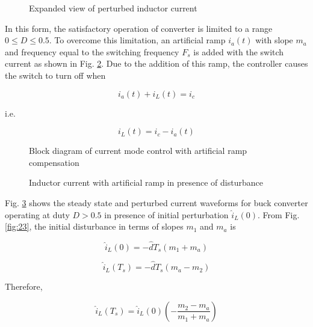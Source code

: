 \documentclass[a4paper]{IEEEtran}
\begin{document}
	\begin{figure}
		\centering
		
		\caption{Expanded view of perturbed inductor current}
		\label{fig:20}
	\end{figure}

	In this form, the satisfactory operation of converter is limited to a range $0 \leq D \leq 0.5$. To overcome this limitation, an artificial ramp $i_a(t)$ with slope $m_a$ and frequency equal to the switching frequency $F_s$ is added with the switch current as shown in Fig. \ref{fig:21}. Due to the addition of this ramp, the controller causes the switch to turn off when

	\begin{equation*}
		i_a(t) + i_L(t) = i_c
	\end{equation*}

	i.e.

	\begin{equation}
		i_L(t) = i_c - i_a(t)
		\label{eq:9}
	\end{equation}

	\begin{figure}
		\centering
		
		\caption{Block diagram of current mode control with artificial ramp compensation}
		\label{fig:21}
	\end{figure}

	\begin{figure}
		\centering
		
		\caption{Inductor current with artificial ramp in presence of disturbance}
		\label{fig:22}
	\end{figure}

	Fig. \ref{fig:22} shows the steady state and perturbed current waveforms for buck converter operating at duty $D>0.5$ in presence of initial perturbation $\hat{i}_L(0)$. From Fig. \ref{fig:23}, the initial disturbance in terms of slopes $m_1$ and $m_a$ is

	\begin{equation}
		\hat{i}_L(0) = -\hat{d}T_s(m_1+m_a)
		\label{eq:10}
	\end{equation}

	\begin{equation}
		\hat{i}_L(T_s) = -\hat{d}T_s(m_a-m_2)
		\label{eq:11}
	\end{equation}

	Therefore,

	\begin{equation}
		\hat{i}_L(T_s) = \hat{i}_L(0)\left(-\dfrac{m_2-m_a}{m_1+m_a} \right)
		\label{eq:12}
	\end{equation}
\end{document}
